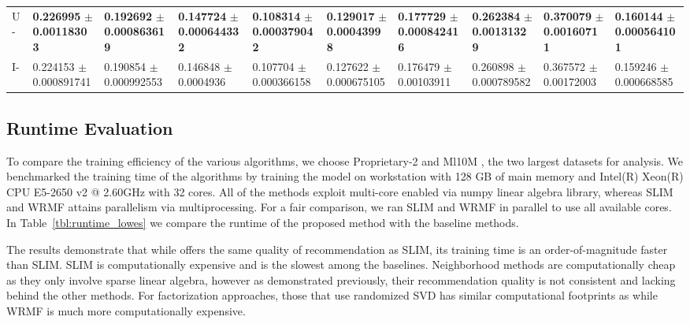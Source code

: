 \documentclass{article}
\newcommand{\MLens}{{\sc Ml10M }}
\newcommand{\Lowes}{{\sc Proprietary-2 }}
\begin{document}
\begin{table*}[!htb]
{\begin{tabular}{l|llll|llll|l}
		U-\LinearLow & \textbf{\num{0.226995}} $\pm$ \textbf{\num{0.00118303} }& \textbf{\num{0.192692}} $\pm$ \textbf{\num{0.000863619}} & \textbf{\num{0.147724}} $\pm$ \textbf{\num{0.000644332}} & \textbf{\num{0.108314}} $\pm$ \textbf{\num{0.000379042}} & \textbf{\num{0.129017}} $\pm$ \textbf{\num{0.00043998} }& \textbf{\num{0.177729}} $\pm$ \textbf{\num{0.000842416}} & \textbf{\num{0.262384}} $\pm$ \textbf{\num{0.00131329} }& \textbf{\num{0.370079}} $\pm$ \textbf{\num{0.00160711} }& \textbf{\num{0.160144}} $\pm$ \textbf{\num{0.000564101}}\\

		I-\LinearLow&\num{0.224153} $\pm$ \num{0.000891741}&\num{0.190854} $\pm$ \num{0.000992553}&\num{0.146848} $\pm$ \num{0.0004936}&\num{0.107704} $\pm$ \num{0.000366158}&\num{0.127622} $\pm$ \num{0.000675105}&\num{0.176479} $\pm$ \num{0.00103911}&\num{0.260898} $\pm$ \num{0.000789582}&\num{0.367572} $\pm$ \num{0.00172003}&\num{0.159246} $\pm$ \num{0.000668585}\\
		\hline
	\end{tabular}
}
\end{table*}


\subsection{Runtime Evaluation}
\label{section:scalability}



To compare the training efficiency of the various algorithms, we choose \Lowes and \MLens, the two largest datasets for analysis.
We benchmarked the training time of the algorithms
by training the model on  workstation with 128 GB of main memory and Intel(R) Xeon(R) CPU E5-2650 v2 @ 2.60GHz with 32 cores. All of the methods exploit multi-core enabled via numpy linear algebra library, whereas SLIM and WRMF attains parallelism via multiprocessing. For a fair comparison, we ran  SLIM and WRMF in parallel to use all available cores.  In Table~\ref{tbl:runtime_lowes} we compare the runtime of the proposed method with the baseline methods.

The results demonstrate that while \LinearLow offers the same quality of recommendation as SLIM, its training time is an order-of-magnitude
faster than SLIM.  SLIM is computationally expensive and is the slowest among the baselines.
Neighborhood methods are computationally cheap as they only involve sparse linear algebra, however as demonstrated previously, their recommendation
quality is not consistent and lacking behind the other methods.
For factorization approaches, those that use randomized SVD has similar computational footprints as \LinearLow while
WRMF is much more computationally expensive.
\end{document}
